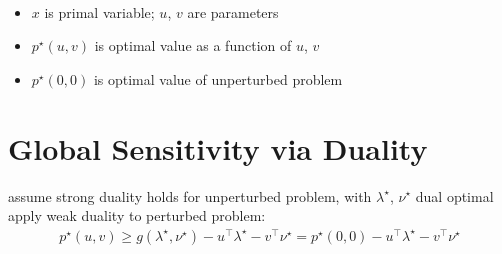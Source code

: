 \documentclass[11pt]{extarticle}
\newcommand{\ds}{\displaystyle}
\theoremstyle{definition}
\begin{document}
 \\
\begin{minipage}[t]{0.575\textwidth}\vspace{-5mm}
    \end{minipage}
    \begin{minipage}[t]{0.425\textwidth}\vspace{-5mm}
    \end{minipage}
\begin{itemize}\setlength\itemsep{0em}
  \item $x$ is primal variable; $u$, $v$ are parameters
  \item $\ds p^\star(u, v)$ is optimal value as a function of $u$, $v$ 
  \item $\ds p^\star(0, 0)$ is optimal value of unperturbed problem
\end{itemize}

\newpage

\section*{Global Sensitivity via Duality}

assume strong duality holds for unperturbed problem, with $\lambda^\star$, $\nu^\star$ dual optimal \\

\noindent
apply weak duality to perturbed problem:  
\begin{align*}
  p^\star(u, v)\geqslant g(\lambda^\star, \nu^\star) - u^\top\lambda^\star - v^\top\nu^\star = p^\star(0, 0) - u^\top\lambda^\star - v^\top\nu^\star 
\end{align*}
\end{document}
